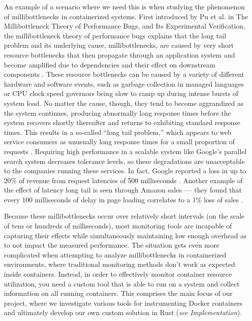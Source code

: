 \documentclass[a4paper,11pt]{article}
\begin{document}
An example of a scenario where we need this is when studying the phenomenon of millibottlenecks in containerized systems.
First introduced by Pu et al. in The Millibottleneck Theory of Performance Bugs, and Its Experimental Verification,
the millibottleneck theory of performance bugs explains that the long tail problem and its underlying cause, millibottlenecks,
are caused by very short resource bottlenecks that then propagate through an application system
and become amplified due to dependencies and their effect on downstream components \cite{Millibottleneck}.
These resource bottlenecks can be caused by a variety of different hardware and software events,
such as garbage collection in managed languages or CPU clock speed governors being slow to ramp up during intense bursts of system load.
No matter the cause, though, they tend to become aggrandized as the system continues,
producing abnormally long response times before the system recovers shortly thereafter
and returns to exhibiting standard response times.
This results in a so-called ``long tail problem,''
which appears to web service consumers as unusually long response times for a small proportion of requests \cite{Tail-At-Scale}.
Requiring high performance in a scalable system like Google’s parallel search system decreases tolerance levels,
so these degradations are unacceptable to the companies running these services.
In fact, Google reported a loss in up to 20\% of revenue from request latencies of 500 milliseconds \cite{Google}.
Another example of the effect of latency long tail is seen through Amazon sales—--
they found that every 100 milliseconds of delay in page loading correlates to a 1\% loss of sales \cite{Millibottleneck}. 

Because these millibottlenecks occur over relatively short intervals (on the scale of tens or hundreds of milliseconds),
most monitoring tools are incapable of capturing their effects
while simultaneously maintaining low enough overhead as to not impact the measured performance.
The situation gets even more complicated when attempting to analyze millibottlenecks in containerized environments,
where traditional monitoring methods don't work as expected inside containers.
Instead, in order to effectively monitor container resource utilization,
you need a custom tool that is able to run on a system and collect information on all running containers.
This comprises the main focus of our project,
where we investigate various tools for instrumenting Docker containers
and ultimately develop our own custom solution in Rust (\textit{see Implementation}).
\end{document}
